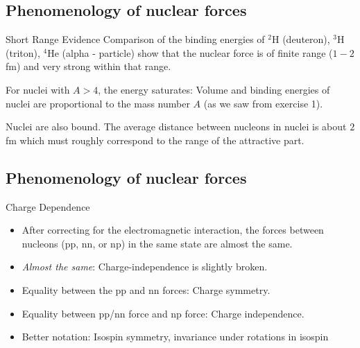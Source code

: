 \documentclass[%
twoside,                 %
final,                   %
10pt]{article}
\begin{document}
\subsection{Phenomenology of nuclear forces}
\begin{block}{Short Range Evidence }
Comparison of the binding energies of
${}^2\mbox{H}$ (deuteron), ${}^3\mbox{H}$ (triton), ${}^4\mbox{He}$ (alpha - particle) show that the nuclear force is of finite range ($1-2$ fm) and very strong within that range.

For nuclei with $A>4$, the energy saturates: Volume and binding energies of nuclei are proportional to the mass number $A$ (as we saw from exercise 1).

Nuclei are also bound. The average distance
between nucleons in nuclei is about $2$ fm which
must roughly correspond to the range of the
attractive part.

\end{block}

\subsection{Phenomenology of nuclear forces}
\begin{block}{Charge Dependence }

\begin{itemize}
 \item After correcting for the electromagnetic interaction, the forces between nucleons (pp, nn, or np) in the same state are almost the same.

 \item \emph{Almost the same}: Charge-independence is slightly broken.

 \item Equality between the pp and nn forces: Charge symmetry.

 \item Equality between pp/nn force and np force: Charge independence.

 \item Better notation: Isospin symmetry, invariance under rotations in isospin
\end{itemize}

\noindent
\end{block}

\end{document}
